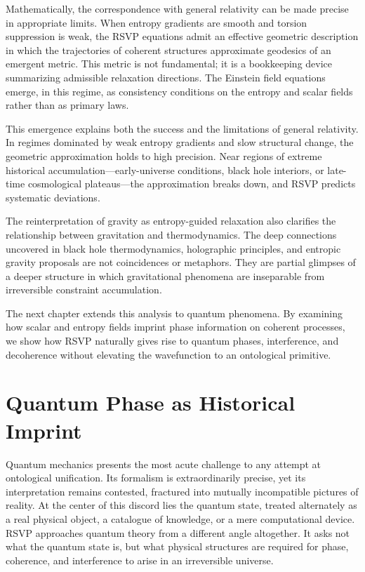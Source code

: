 \documentclass[11pt,oneside]{book}
\begin{document}
Mathematically, the correspondence with general relativity can be made precise in appropriate limits. When entropy gradients are smooth and torsion suppression is weak, the RSVP equations admit an effective geometric description in which the trajectories of coherent structures approximate geodesics of an emergent metric. This metric is not fundamental; it is a bookkeeping device summarizing admissible relaxation directions. The Einstein field equations emerge, in this regime, as consistency conditions on the entropy and scalar fields rather than as primary laws.

This emergence explains both the success and the limitations of general relativity. In regimes dominated by weak entropy gradients and slow structural change, the geometric approximation holds to high precision. Near regions of extreme historical accumulation—early-universe conditions, black hole interiors, or late-time cosmological plateaus—the approximation breaks down, and RSVP predicts systematic deviations.

The reinterpretation of gravity as entropy-guided relaxation also clarifies the relationship between gravitation and thermodynamics. The deep connections uncovered in black hole thermodynamics, holographic principles, and entropic gravity proposals are not coincidences or metaphors. They are partial glimpses of a deeper structure in which gravitational phenomena are inseparable from irreversible constraint accumulation.

The next chapter extends this analysis to quantum phenomena. By examining how scalar and entropy fields imprint phase information on coherent processes, we show how RSVP naturally gives rise to quantum phases, interference, and decoherence without elevating the wavefunction to an ontological primitive.

\chapter{Quantum Phase as Historical Imprint}

Quantum mechanics presents the most acute challenge to any attempt at ontological unification. Its formalism is extraordinarily precise, yet its interpretation remains contested, fractured into mutually incompatible pictures of reality. At the center of this discord lies the quantum state, treated alternately as a real physical object, a catalogue of knowledge, or a mere computational device. RSVP approaches quantum theory from a different angle altogether. It asks not what the quantum state is, but what physical structures are required for phase, coherence, and interference to arise in an irreversible universe.
\end{document}
